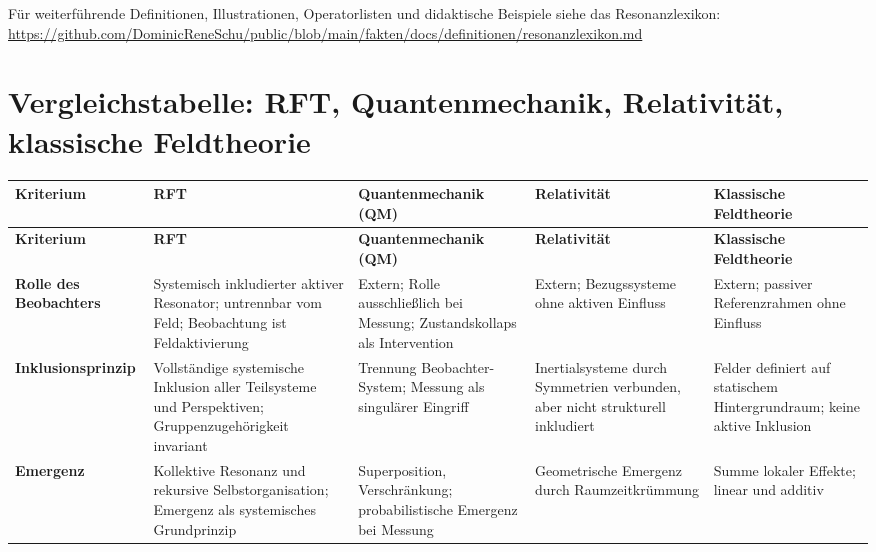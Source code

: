 \documentclass[12pt]{iopart}
\begin{document}
\noindent
Für weiterführende Definitionen, Illustrationen, Operatorlisten und didaktische Beispiele siehe das Resonanzlexikon:\\
\url{https://github.com/DominicReneSchu/public/blob/main/fakten/docs/definitionen/resonanzlexikon.md}
\newpage


\section*{Vergleichstabelle: RFT, Quantenmechanik, Relativität, klassische Feldtheorie}

\renewcommand{\arraystretch}{1.3}
\begin{center}
	\begin{longtable}{|p{4cm}|p{3cm}|p{3cm}|p{3cm}|p{3cm}|}
		\hline
		\textbf{Kriterium} & \textbf{RFT} & \textbf{Quantenmechanik (QM)} & \textbf{Relativität} & \textbf{Klassische Feldtheorie} \\
		\hline
		\endfirsthead
		
		\hline
		\textbf{Kriterium} & \textbf{RFT} & \textbf{Quantenmechanik (QM)} & \textbf{Relativität} & \textbf{Klassische Feldtheorie} \\
		\hline
		\endhead
		
		\hline
		\endfoot
		
		\hline
		\endlastfoot
		
		\textbf{Rolle des Beobachters} & Systemisch inkludierter aktiver Resonator; untrennbar vom Feld; Beobachtung ist Feldaktivierung & Extern; Rolle ausschließlich bei Messung; Zustandskollaps als Intervention & Extern; Bezugssysteme ohne aktiven Einfluss & Extern; passiver Referenzrahmen ohne Einfluss \\
		\hline
		
		\textbf{Inklusionsprinzip} & Vollständige systemische Inklusion aller Teilsysteme und Perspektiven; Gruppenzugehörigkeit invariant & Trennung Beobachter-System; Messung als singulärer Eingriff & Inertialsysteme durch Symmetrien verbunden, aber nicht strukturell inkludiert & Felder definiert auf statischem Hintergrundraum; keine aktive Inklusion \\
		\hline
		
		\textbf{Emergenz} & Kollektive Resonanz und rekursive Selbstorganisation; Emergenz als systemisches Grundprinzip & Superposition, Verschränkung; probabilistische Emergenz bei Messung & Geometrische Emergenz durch Raumzeitkrümmung & Summe lokaler Effekte; linear und additiv \\
		\hline
		

\end{longtable}
\end{center}
\end{document}
